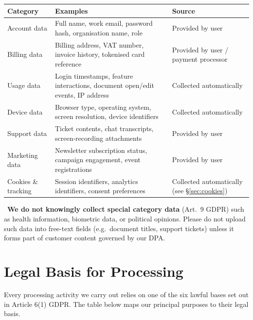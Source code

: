 \documentclass[11pt,a4paper]{scrartcl}
\begin{document}
\begin{tabularx}{\linewidth}{@{}l Y l@{}}
\toprule
\textbf{Category} & \textbf{Examples} & \textbf{Source} \\
\midrule
Account data & Full name, work email, password hash, organisation name, role & Provided by
  user \\
Billing data & Billing address, VAT number, invoice history, tokenised card reference &
  Provided by user / payment processor \\
Usage data & Login timestamps, feature interactions, document open/edit events, IP address &
  Collected automatically \\
Device data & Browser type, operating system, screen resolution, device identifiers &
  Collected automatically \\
Support data & Ticket contents, chat transcripts, screen-recording attachments &
  Provided by user \\
Marketing data & Newsletter subscription status, campaign engagement, event registrations &
  Provided by user \\
Cookies \& tracking & Session identifiers, analytics identifiers, consent preferences &
  Collected automatically (see \S\ref{sec:cookies}) \\
\bottomrule
\end{tabularx}

\vspace{4pt}
\begin{noticebox}
\faExclamationTriangle\ \textbf{We do not knowingly collect special category data} (Art.\ 9
GDPR) such as health information, biometric data, or political opinions. Please do not upload
such data into free-text fields (e.g.\ document titles, support tickets) unless it forms part of
customer content governed by our DPA.
\end{noticebox}

\section{Legal Basis for Processing}

Every processing activity we carry out relies on one of the six lawful bases set out in Article
6(1) GDPR. The table below maps our principal purposes to their legal basis.
\end{document}

